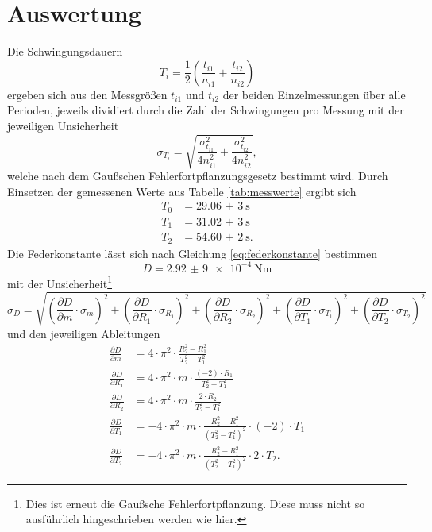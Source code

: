 \section{Auswertung}

Die Schwingungsdauern 
\begin{equation}
    T_i = \frac{1}{2}\left(\frac{t_{i1}}{n_{i1}} + \frac{t_{i2}}{n_{i2}}\right)
\end{equation}
ergeben sich aus den Messgrößen $t_{i1}$ und $t_{i2}$ der beiden Einzelmessungen über alle Perioden, jeweils dividiert durch die Zahl der Schwingungen pro Messung mit der jeweiligen Unsicherheit
\begin{equation}
    \sigma_{T_i} = \sqrt{\frac{\sigma_{t_{i1}}^2}{4 n_{i1}^2} + \frac{\sigma_{t_{i2}}^2}{4 n_{i2}^2}} ,
\end{equation}
welche nach dem Gaußschen Fehlerfortpflanzungsgesetz bestimmt wird.
Durch Einsetzen der gemessenen Werte aus Tabelle \ref{tab:messwerte} ergibt sich
\begin{align*}
    T_0 &= \qty{29,06(3)}{\second} \\
    T_1 &= \qty{31,02(3)}{\second} \\
    T_2 &= \qty{54,60(2)}{\second} .
\end{align*}
Die Federkonstante lässt sich nach Gleichung \eqref{eq:federkonstante} bestimmen
\begin{equation*}
    D = \qty{2,92(9)e-4}{\newton\meter}
\end{equation*}
mit der Unsicherheit\footnote{Dies ist erneut die Gaußsche Fehlerfortpflanzung. Diese muss nicht so ausführlich hingeschrieben werden wie hier.}
\begin{equation*}
    \sigma_D = \sqrt{\left(\frac{\partial D}{\partial m}\cdot \sigma_{m}\right)^2+\left(\frac{\partial D}{\partial R_1}\cdot \sigma_{R_1}\right)^2+\left(\frac{\partial D}{\partial R_2}\cdot \sigma_{R_2}\right)^2+\left(\frac{\partial D}{\partial T_1}\cdot \sigma_{T_1}\right)^2+\left(\frac{\partial D}{\partial T_2}\cdot \sigma_{T_2}\right)^2}
\end{equation*}
und den jeweiligen Ableitungen
\begin{align*}
    \frac{\partial D}{\partial m} &= 4\cdot \pi^2\cdot \frac{R_2^2 - R_1^2}{T_2^2 - T_1^2} \\
    \frac{\partial D}{\partial R_1} &= 4\cdot \pi^2\cdot m\cdot \frac{(-2)\cdot R_1}{T_2^2 - T_1^2} \\
    \frac{\partial D}{\partial R_2} &= 4\cdot \pi^2\cdot m\cdot \frac{2\cdot R_2}{T_2^2 - 
    T_1^2} \\
    \frac{\partial D}{\partial T_1} &= -4\cdot \pi^2\cdot m\cdot \frac{R_2^2 - R_1^2}{(T_2^2-T_1^2)^2}\cdot (-2)\cdot T_1 \\
    \frac{\partial D}{\partial T_2} &= -4\cdot \pi^2\cdot m\cdot \frac{R_2^2 - R_1^2}{(T_2^2 - T_1^2)^2}\cdot 2\cdot T_2 .
\end{align*}
